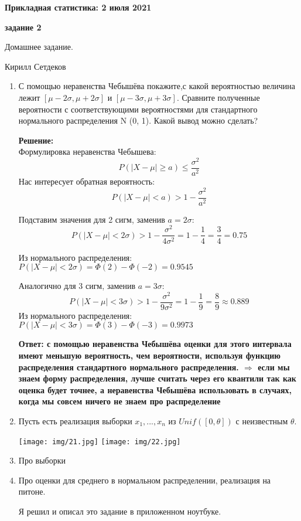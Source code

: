 \documentclass[a4paper,12pt]{article}
\renewcommand{\leq}{\leqslant}
\renewcommand{\geq}{\geqslant}
\newcounter{z}
\renewcommand{\date}{{\bf 2 июля 2021}}
\newcommand{\HSEhat}{
\vspace*{-0pt}
\noindent
\setcounter{z}{0}


{\bf \phantom{\date}  \large \hfill Прикладная статистика: \hfill \normalsize \date}

\vspace{5 pt}
{\bf \large \hfill  задание 2\hfill }

\vspace{15 pt}
\centerline{ \large  Домашнее задание.}
\centerline{ \large  Кирилл Сетдеков}



\vspace*{10pt}
\setcounter{z}{0}

}
\begin{document}
\HSEhat


\begin{enumerate}

\subsection*{Задачи:}

\item С помощью неравенства Чебышёва покажите,с какой вероятностью величина лежит $[\mu - 2 \sigma, \mu + 2 \sigma]$ и  $[\mu -3 \sigma, \mu +3 \sigma]$.
Сравните полученные вероятности с соответствующими вероятностями для стандартного нормального распределения N (0, 1). Какой вывод можно сделать?

\textbf{Решение:}\\
Формулировка неравенства Чебышева:
$$P(|X-\mu| \geq a) \leq \frac{\sigma ^2 }{a^2}$$
Нас интересует обратная вероятность:
$$P(|X-\mu| < a) > 1- \frac{\sigma ^2 }{a^2}$$

Подставим значения для 2 сигм, заменив $a = 2 \sigma$:
$$P(|X-\mu| < 2 \sigma) > 1 - \frac{\sigma ^2 }{4 \sigma^2} = 1-\frac{1}{4} = \frac{3}{4}=0.75$$

Из нормального распределения: $P(|X-\mu| < 2 \sigma) = \Phi(2) - \Phi(-2) = 0.9545$

Аналогично для 3 сигм, заменив $a = 3 \sigma$:
$$P(|X-\mu| < 3 \sigma) > 1 - \frac{\sigma ^2 }{9 \sigma^2} = 1-\frac{1}{9} = \frac{8}{9} \approx 0.889$$
Из нормального распределения: $P(|X-\mu| < 3 \sigma) = \Phi(3) - \Phi(-3) = 0.9973$

\textbf{Ответ: с помощью неравенства Чебышёва оценки для этого интервала имеют меньшую вероятность, чем вероятности, используя функцию распределения стандартного нормального распределения. $\Rightarrow$ если мы знаем форму распределения, лучше считать через его квантили так как оценка будет точнее, а неравенства Чебышёва использовать в случаях, когда мы совсем ничего не знаем про распределение} 

\item Пусть есть реализация выборки $x_1, ... , x_n$ из $Unif([0,\theta])$ с неизвестным $\theta$.

\texttt{[image: img/21.jpg]}
\texttt{[image: img/22.jpg]}

\item Про выборки

\item Про оценки для среднего в нормальном распределении, реализация на питоне.

Я решил и описал это задание в приложенном ноутбуке.




\end{enumerate}
\end{document}
